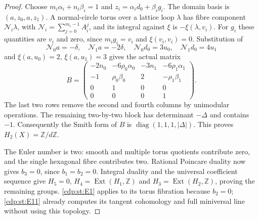 \begin{proof}
Choose $m_i\alpha_i+n_i\beta_i=1$ and
$z_i=\alpha_i d_0+\beta_i g_i$. The domain basis is
$(a,z_0,a,z_1)$. A normal-circle torus over a lattice loop
$\lambda$ has fibre component
$\mathcal N_i\lambda$, with
$\mathcal N_i=\sum_{j=0}^{m_i-1}A_i^j$, and its integral
against $\xi$ is $-\xi(\lambda,v_i)$. For $g_i$ these
quantities are $v_i$ and zero, since $m_i g_i=v_i$ and
$\xi(v_i,v_i)=0$. Substitution of
\[
 \mathcal N_0a=-\delta,\quad\mathcal N_1a=-2\delta,
 \quad\mathcal N_0d_0=3u_0,\quad\mathcal N_1d_0=4u_1
\]
and $\xi(a,u_0)=2$, $\xi(a,u_1)=3$ gives the actual matrix
\[
 B=\begin{pmatrix}
 -2n_0&-6\rho_0\alpha_0&-3n_1&-6\rho_1\alpha_1\\
 -1&\rho_0\beta_0&2&-\rho_1\beta_1\\
 0&1&0&0\\0&0&0&1
 \end{pmatrix}.                              \tag{E.19.2}\label{cdp:eq:E.19.2}
\]
The last two rows remove the second and fourth columns by
unimodular operations. The remaining two-by-two block has
determinant $-\Delta$ and contains $-1$. Consequently the Smith
form of $B$ is $\operatorname{diag}(1,1,1,|\Delta|)$.
This proves $H_2(X)=\mathbb Z/d\mathbb Z$.

The Euler number is two: smooth and multiple torus quotients
contribute zero, and the single hexagonal fibre contributes two.
Rational Poincare duality now gives $b_3=0$, since $b_1=b_2=0$.
Integral duality and the universal coefficient sequence give
$H_5=0$, $H_4=\operatorname{Ext}(H_1,\mathbb Z)$ and
$H_3=\operatorname{Ext}(H_2,\mathbb Z)$, proving the remaining
groups. \ref{cdp:st:E1} applies to its torus fibration because $b_2=0$;
\ref{cdp:st:E11} already computes its tangent cohomology and full miniversal
line without using this topology.
\end{proof}


